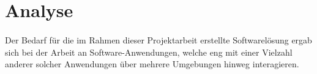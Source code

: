 \section{Analyse}
\paragraph{}
Der Bedarf für die im Rahmen dieser Projektarbeit erstellte Softwarelösung ergab
sich bei der Arbeit an Software-Anwendungen, welche eng mit einer Vielzahl
anderer solcher Anwendungen über mehrere Umgebungen hinweg interagieren.



